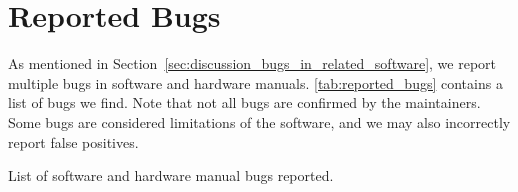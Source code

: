 \chapter{Reported Bugs}
\label{app:appendix_reported_bugs}

As mentioned in Section~\ref{sec:discussion_bugs_in_related_software}, we report multiple bugs in software and hardware manuals. \ref{tab:reported_bugs} contains a list of bugs we find. Note that not all bugs are confirmed by the maintainers. Some bugs are considered limitations of the software, and we may also incorrectly report false positives.

\begin{table}[tbp]
	\begin{center}
	
	\caption{List of software and hardware manual bugs reported.}
	\label{tab:reported_bugs}
	\end{center}
\end{table}

